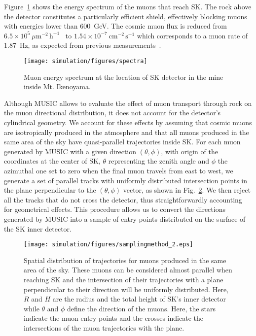 Figure~\ref{fig:musi_final_distrib} shows the energy spectrum of the muons that reach SK. The rock above the detector constitutes a particularly efficient shield, effectively blocking muons with energies lower than $600$~GeV. The cosmic muon flux is reduced from $6.5\times10^{5}~\mu \mathrm{m^{-2}\,h^{-1}}$~\cite{borexino} to $1.54 \times 10^{-7}~\mathrm{cm^{-2}\,s^{-1}}$ which corresponds to a muon rate of 1.87~Hz, as expected from previous measurements~\cite{muonrate1, muonrate2, muonrate3}.
\begin{figure}[tbph]
	\centering
	\texttt{[image: simulation/figures/spectra]}
	\caption{Muon energy spectrum at the location of SK detector in the mine inside Mt. Ikenoyama.}
	\label{fig:musi_final_distrib}
\end{figure}

Although MUSIC allows to evaluate the effect of muon transport through rock on the muon directional distribution, it does not account for the detector's cylindrical geometry. We account for these effects by assuming that cosmic muons are isotropically produced in the atmosphere and that all muons produced in the same area of the sky have quasi-parallel trajectories inside SK. For each muon generated by MUSIC with a given direction $(\theta,\phi)$, with origin of the coordinates at the center of SK, $\theta$ representing the zenith angle and $\phi$ the azimuthal one set to zero when the final muon travels from east to west, we generate a set of parallel tracks with uniformly distributed intersection points in the plane perpendicular to the $(\theta,\phi)$ vector, as shown in Fig.~\ref{fig:muentrypoints}. We then reject all the tracks that do not cross the detector, thus straightforwardly accounting for geometrical effects. This procedure allows us to convert the directions generated by MUSIC into a sample of entry points distributed on the surface of the SK inner detector. 
\begin{figure}
    \centering
    \texttt{[image: simulation/figures/samplingmethod\_2.eps]}  %
    \caption{Spatial distribution of trajectories for muons produced in the same area of the sky. These muons can be considered almost parallel when reaching SK and the intersection of their trajectories with a plane perpendicular to their direction will be uniformly distributed. Here, $R$ and $H$ are the radius and the total height of SK's inner detector while $\theta$ and $\phi$ define the direction of the muons. Here, the stars indicate the muon entry points and the crosses indicate the intersections of the muon trajectories with the plane.}
    \label{fig:muentrypoints}
\end{figure}
